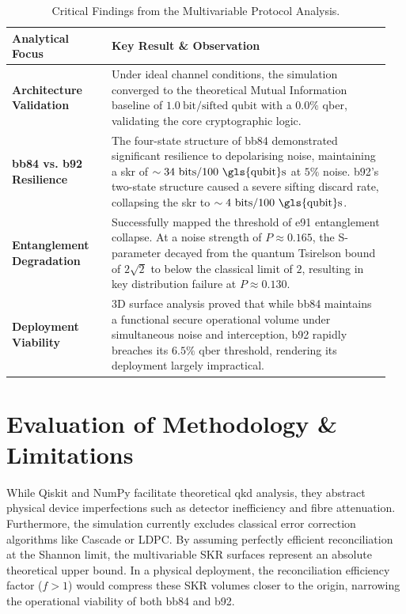 \documentclass[11pt, a4paper]{report}
\renewcommand{\footnotesize}{\fontsize{9}{10}\selectfont}
\begin{document}
\begin{table}[htbp]
    \centering
    \caption{Critical Findings from the Multivariable Protocol Analysis.}
    \label{tab:key_findings}
    \footnotesize
    \renewcommand{\arraystretch}{1.4} %
    \begin{tabular}{@{}p{0.25\linewidth} p{0.7\linewidth}@{}}
        \toprule
        \textbf{Analytical Focus} & \textbf{Key Result \& Observation} \\
        \midrule
        \textbf{Architecture Validation} & Under ideal channel conditions, the simulation converged to the theoretical Mutual Information baseline of \( 1.0\ \text{bit/sifted qubit} \) with a \( 0.0\% \) \gls{qber}, validating the core cryptographic logic. \\
        
        \textbf{\gls{bb84} vs. \gls{b92} Resilience} & The four-state structure of \gls{bb84} demonstrated significant resilience to depolarising noise, maintaining a \gls{skr} of \( \sim34\ \text{bits/100 \gls{qubit}s} \) at \( 5\% \) noise. \gls{b92}'s two-state structure caused a severe sifting discard rate, collapsing the \gls{skr} to \( \sim4\ \text{bits/100 \gls{qubit}s} \). \\
        
        \textbf{Entanglement Degradation} & Successfully mapped the threshold of \gls{e91} \gls{entanglement} collapse. At a noise strength of \( P \approx 0.165 \), the S-parameter decayed from the quantum Tsirelson bound of \( 2\sqrt{2} \) to below the classical limit of \( 2 \), resulting in key distribution failure at \( P \approx 0.130 \). \\
        
        \textbf{Deployment Viability} & 3D surface analysis proved that while \gls{bb84} maintains a functional secure operational volume under simultaneous noise and interception, \gls{b92} rapidly breaches its \( 6.5\% \) \gls{qber} threshold, rendering its deployment largely impractical. \\
        \bottomrule
    \end{tabular}
\end{table}

\section{Evaluation of Methodology \& Limitations}
\label{sec:eval}
While Qiskit and NumPy facilitate theoretical \gls{qkd} analysis, they abstract physical device imperfections such as detector inefficiency and fibre attenuation. Furthermore, the simulation currently excludes classical error correction algorithms like Cascade \cite{Cascade1994} or LDPC. By assuming perfectly efficient reconciliation at the Shannon limit, the multivariable SKR surfaces represent an absolute theoretical upper bound. In a physical deployment, the reconciliation efficiency factor (\(f > 1\)) would compress these SKR volumes closer to the origin, narrowing the operational viability of both \gls{bb84} and \gls{b92}.
\end{document}
